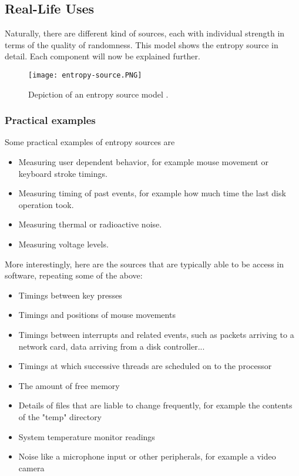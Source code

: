 \clearpage
\subsection{Real-Life Uses}
Naturally, there are different kind of sources, each with individual strength in terms of the quality of randomness.
This model shows the entropy source in detail. Each component will now be explained further.

\begin{figure}[H]
    \centering
    \texttt{[image: entropy-source.PNG]}
    \caption{Depiction of an entropy source model \cite{randomness:sources1}.}
\end{figure}

\subsubsection{Practical examples}
Some practical examples of entropy sources are 

\begin{itemize}
    \item Measuring user dependent behavior, for example mouse movement or keyboard stroke timings.
    \item Measuring timing of past events, for example how much time the last disk operation took.
    \item Measuring thermal or radioactive noise.
    \item Measuring voltage levels.
\end{itemize}

\noindent
More interestingly, here are the sources that are typically able to be access in software, repeating some of the above:

\begin{itemize}
    \item Timings between key presses
    \item Timings and positions of mouse movements
    \item Timings between interrupts and related events, such as packets arriving to a network card, data arriving from a disk controller...
    \item Timings at which successive threads are scheduled on to the processor
    \item The amount of free memory
    \item Details of files that are liable to change frequently, for example the contents of the "temp" directory
    \item System temperature monitor readings
    \item Noise like a microphone input or other peripherals, for example a video camera
\end{itemize}

